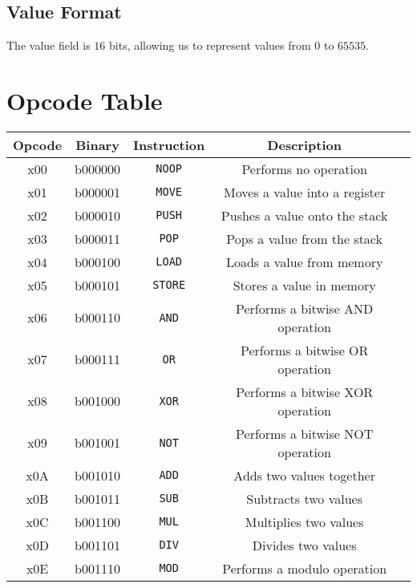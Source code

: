 \documentclass[12pt,a4paper]{article}
\begin{document}
\subsection{Value Format}

The value field is $16$ bits, allowing us to represent values from $0$ to
$65535$.

\section{Opcode Table}

\begin{center}
\begin{tabular}{ c c c c c }
    \textbf{Opcode} & \textbf{Binary} & \textbf{Instruction} & \textbf{Description} \\
    \hline
    x00 & b000000 & \texttt{NOOP} & Performs no operation \\

    \hline

    x01 & b000001 & \texttt{MOVE} & Moves a value into a register \\

    \hline

    x02 & b000010 & \texttt{PUSH} & Pushes a value onto the stack \\
    x03 & b000011 & \texttt{POP} & Pops a value from the stack \\
    x04 & b000100 & \texttt{LOAD} & Loads a value from memory \\
    x05 & b000101 & \texttt{STORE} & Stores a value in memory \\

    \hline

    x06 & b000110 & \texttt{AND} & Performs a bitwise AND operation \\
    x07 & b000111 & \texttt{OR} & Performs a bitwise OR operation \\
    x08 & b001000 & \texttt{XOR} & Performs a bitwise XOR operation \\
    x09 & b001001 & \texttt{NOT} & Performs a bitwise NOT operation \\

    \hline

    x0A & b001010 & \texttt{ADD} & Adds two values together \\
    x0B & b001011 & \texttt{SUB} & Subtracts two values \\
    x0C & b001100 & \texttt{MUL} & Multiplies two values \\
    x0D & b001101 & \texttt{DIV} & Divides two values \\
    x0E & b001110 & \texttt{MOD} & Performs a modulo operation \\
\end{tabular}
\end{center}


\end{document}
